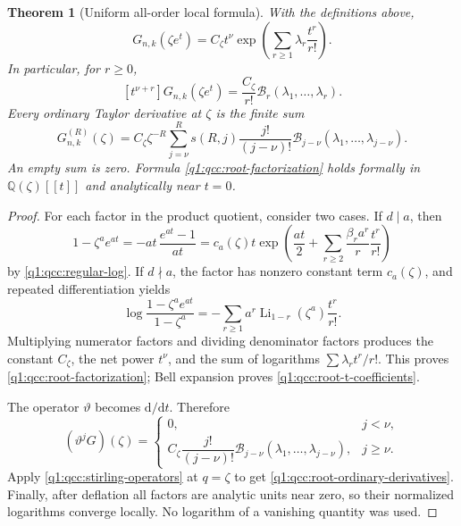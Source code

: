\documentclass[11pt,a4paper,oneside,openany]{book}
\newtheorem{theorem}{Theorem}[chapter]
\theoremstyle{definition}
\theoremstyle{remark}
\newcommand{\Q}{\mathbb Q}
\newcommand{\Y}[1]{\mathcal B_{#1}}
\DeclareMathOperator{\Li}{Li}
\newcommand{\logq}{\vartheta}
\begin{document}
\begin{theorem}[Uniform all-order local formula]\label{q1:qcc:root-jets}
With the definitions above,
\begin{equation}\label{q1:qcc:root-factorization}
 \boxed{\quad
 G_{n,k}(\zeta e^t)
  =C_\zeta t^\nu
     \exp\left(\sum_{r\ge1}\lambda_r\frac{t^r}{r!}\right).
 \quad}
\end{equation}
In particular, for \(r\ge0\),
\begin{equation}\label{q1:qcc:root-t-coefficients}
 [t^{\nu+r}]G_{n,k}(\zeta e^t)
       =\frac{C_\zeta}{r!}\Y r(\lambda_1,\ldots,\lambda_r).
\end{equation}
Every ordinary Taylor derivative at \(\zeta\) is the finite sum
\begin{equation}\label{q1:qcc:root-ordinary-derivatives}
 G_{n,k}^{(R)}(\zeta)
 =C_\zeta\zeta^{-R}
   \sum_{j=\nu}^{R}s(R,j)\frac{j!}{(j-\nu)!}
               \Y{j-\nu}(\lambda_1,\ldots,\lambda_{j-\nu}).
\end{equation}
An empty sum is zero. Formula \eqref{q1:qcc:root-factorization} holds formally
in \(\Q(\zeta)[[t]]\) and analytically near \(t=0\).
\end{theorem}
\begin{proof}
For each factor in the product quotient, consider two cases. If \(d\mid a\),
then
\[
 1-\zeta^ae^{at}=-at\,\frac{e^{at}-1}{at}
 =c_a(\zeta)t
     \exp\left(\frac{at}{2}
          +\sum_{r\ge2}\frac{\beta_ra^r}{r}\frac{t^r}{r!}\right)
\]
by \cref{q1:qcc:regular-log}. If \(d\nmid a\), the factor has nonzero
constant term \(c_a(\zeta)\), and repeated differentiation yields
\[
 \log\frac{1-\zeta^ae^{at}}{1-\zeta^a}
 =-\sum_{r\ge1}a^r\Li_{1-r}(\zeta^a)\frac{t^r}{r!}.
\]
Multiplying numerator factors and dividing denominator factors produces the
constant \(C_\zeta\), the net power \(t^\nu\), and the sum of logarithms
\(\sum\lambda_rt^r/r!\). This proves \eqref{q1:qcc:root-factorization};
Bell expansion proves \eqref{q1:qcc:root-t-coefficients}.

The operator \(\logq\) becomes \(\mathrm d/\mathrm dt\). Therefore
\[
 (\logq^jG)(\zeta)=
 \begin{cases}
 0,&j<\nu,\\
 C_\zeta\dfrac{j!}{(j-\nu)!}
        \Y{j-\nu}(\lambda_1,\ldots,\lambda_{j-\nu}),&j\ge\nu.
 \end{cases}
\]
Apply \eqref{q1:qcc:stirling-operators} at \(q=\zeta\) to get
\eqref{q1:qcc:root-ordinary-derivatives}. Finally, after deflation all factors
are analytic units near zero, so their normalized logarithms converge locally.
No logarithm of a vanishing quantity was used.
\end{proof}
\end{document}
